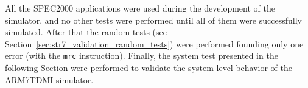 All the SPEC2000 applications were used during the development of the simulator, and no other tests were performed until all of them were successfully simulated.
After that the random tests (see Section~\ref{sec:str7_validation_random_tests}) were performed founding only one error (with the \texttt{mrc} instruction).
Finally, the system test presented in the following Section were performed to validate the system level behavior of the ARM7TDMI simulator.
